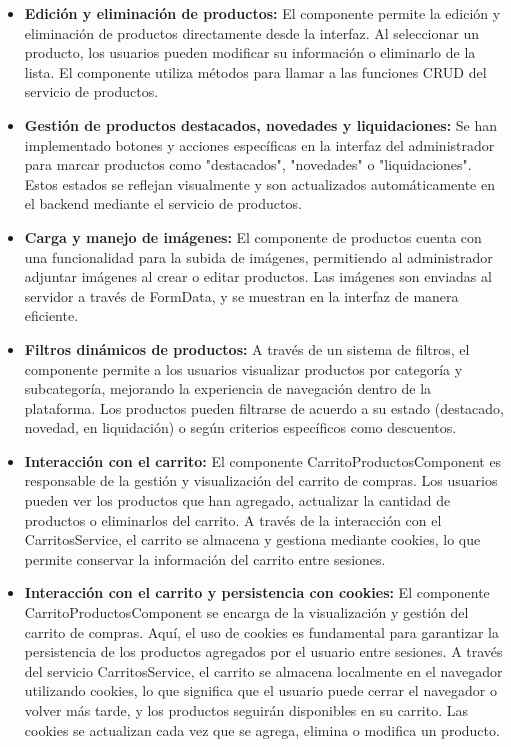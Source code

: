 \begin{itemize}
\begin{itemize}
    \item \textbf{Edición y eliminación de productos: } El componente permite la edición y eliminación de productos directamente desde la interfaz. Al seleccionar un producto, los usuarios pueden modificar su información o eliminarlo de la lista. El componente utiliza métodos para llamar a las funciones CRUD del servicio de productos.
    
    \item \textbf{Gestión de productos destacados, novedades y liquidaciones: } Se han implementado botones y acciones específicas en la interfaz del administrador para marcar productos como "destacados", "novedades" o "liquidaciones". Estos estados se reflejan visualmente y son actualizados automáticamente en el backend mediante el servicio de productos.
    
    \item \textbf{Carga y manejo de imágenes: } El componente de productos cuenta con una funcionalidad para la subida de imágenes, permitiendo al administrador adjuntar imágenes al crear o editar productos. Las imágenes son enviadas al servidor a través de FormData, y se muestran en la interfaz de manera eficiente.
    
    \item \textbf{Filtros dinámicos de productos: } A través de un sistema de filtros, el componente permite a los usuarios visualizar productos por categoría y subcategoría, mejorando la experiencia de navegación dentro de la plataforma. Los productos pueden filtrarse de acuerdo a su estado (destacado, novedad, en liquidación) o según criterios específicos como descuentos.

    \item \textbf{Interacción con el carrito: } El componente CarritoProductosComponent es responsable de la gestión y visualización del carrito de compras. Los usuarios pueden ver los productos que han agregado, actualizar la cantidad de productos o eliminarlos del carrito. A través de la interacción con el CarritosService, el carrito se almacena y gestiona mediante cookies, lo que permite conservar la información del carrito entre sesiones.

    \item \textbf{Interacción con el carrito y persistencia con cookies: } El componente CarritoProductosComponent se encarga de la visualización y gestión del carrito de compras. Aquí, el uso de cookies es fundamental para garantizar la persistencia de los productos agregados por el usuario entre sesiones. A través del servicio CarritosService, el carrito se almacena localmente en el navegador utilizando cookies, lo que significa que el usuario puede cerrar el navegador o volver más tarde, y los productos seguirán disponibles en su carrito. Las cookies se actualizan cada vez que se agrega, elimina o modifica un producto.


\end{itemize}
\end{itemize}
